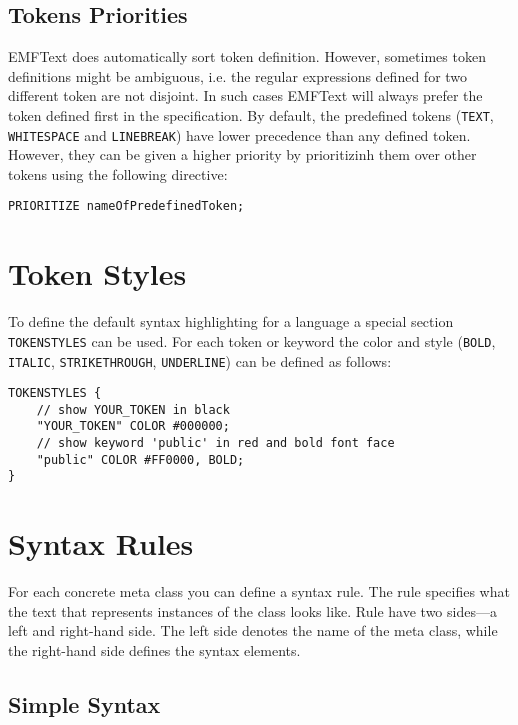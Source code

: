 \subsection{Tokens Priorities}

EMFText does automatically sort token definition. However, sometimes 
token definitions might be ambiguous, i.e. the regular expressions defined for
two different token are not disjoint. In such cases EMFText will always prefer
the token defined first in the specification. By default, the predefined tokens
(\texttt{TEXT}, \texttt{WHITESPACE} and \texttt{LINEBREAK}) have lower
precedence than any defined token. However, they can be given a higher priority
by prioritizinh them over other tokens using the following directive:

\begin{lstlisting}
PRIORITIZE nameOfPredefinedToken;
\end{lstlisting}

\section{Token Styles}

To define the default syntax highlighting for a language a special section
\texttt{TOKENSTYLES} can be used. For each token or keyword the color and
style (\texttt{BOLD}, \texttt{ITALIC}, \texttt{STRIKETHROUGH},
\texttt{UNDERLINE}) can be defined as follows:

\begin{lstlisting}
TOKENSTYLES {
    // show YOUR_TOKEN in black
    "YOUR_TOKEN" COLOR #000000;
    // show keyword 'public' in red and bold font face
    "public" COLOR #FF0000, BOLD;
}
\end{lstlisting}

\section{Syntax Rules}

For each concrete meta class you can define a syntax rule. The rule specifies
what the text that represents instances of the class looks like. Rule have two
sides---a left and right-hand side. The left side denotes the name of the meta
class, while the right-hand side defines the syntax elements.

\subsection{Simple Syntax}

